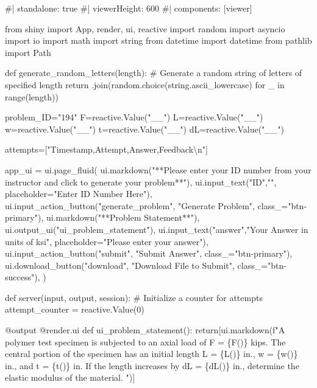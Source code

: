 \documentclass[
  letterpaper,
  DIV=11,
  numbers=noendperiod]{scrreprt}
\newenvironment{Shaded}{\begin{snugshade}}{\end{snugshade}}
\newcommand{\NormalTok}[1]{\textcolor[rgb]{0.00,0.23,0.31}{#1}}
\begin{document}
\begin{Shaded}
\begin{Highlighting}[]
\NormalTok{\#| standalone: true}
\NormalTok{\#| viewerHeight: 600}
\NormalTok{\#| components: [viewer]}

\NormalTok{from shiny import App, render, ui, reactive}
\NormalTok{import random}
\NormalTok{import asyncio}
\NormalTok{import io}
\NormalTok{import math}
\NormalTok{import string}
\NormalTok{from datetime import datetime}
\NormalTok{from pathlib import Path}

\NormalTok{def generate\_random\_letters(length):}
\NormalTok{    \# Generate a random string of letters of specified length}
\NormalTok{    return \textquotesingle{}\textquotesingle{}.join(random.choice(string.ascii\_lowercase) for \_ in range(length)) }

\NormalTok{problem\_ID="194"}
\NormalTok{F=reactive.Value("\_\_")}
\NormalTok{L=reactive.Value("\_\_")}
\NormalTok{w=reactive.Value("\_\_")}
\NormalTok{t=reactive.Value("\_\_")}
\NormalTok{dL=reactive.Value("\_\_")}


\NormalTok{attempts=["Timestamp,Attempt,Answer,Feedback\textbackslash{}n"]}

\NormalTok{app\_ui = ui.page\_fluid(}
\NormalTok{    ui.markdown("**Please enter your ID number from your instructor and click to generate your problem**"),}
\NormalTok{    ui.input\_text("ID","", placeholder="Enter ID Number Here"),}
\NormalTok{    ui.input\_action\_button("generate\_problem", "Generate Problem", class\_="btn{-}primary"),}
\NormalTok{    ui.markdown("**Problem Statement**"),}
\NormalTok{    ui.output\_ui("ui\_problem\_statement"),}
\NormalTok{    ui.input\_text("answer","Your Answer in units of ksi", placeholder="Please enter your answer"),}
\NormalTok{    ui.input\_action\_button("submit", "Submit Answer", class\_="btn{-}primary"),}
\NormalTok{    ui.download\_button("download", "Download File to Submit", class\_="btn{-}success"),}
\NormalTok{)}


\NormalTok{def server(input, output, session):}
\NormalTok{    \# Initialize a counter for attempts}
\NormalTok{    attempt\_counter = reactive.Value(0)}

\NormalTok{    @output}
\NormalTok{    @render.ui}
\NormalTok{    def ui\_problem\_statement():}
\NormalTok{        return[ui.markdown(f"A polymer test specimen is subjected to an axial load of F = \{F()\} kips. The central portion of the specimen has an initial length L = \{L()\} in., w = \{w()\} in., and t = \{t()\} in. If the length increases by dL = \{dL()\} in., determine the elastic modulus of the material. ")]}
    

\end{Highlighting}
\end{Shaded}
\end{document}
